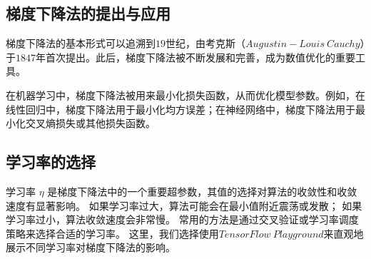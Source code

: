 \documentclass[printMode=true, declarePage=false]{ecnuthesis}
\begin{document}
    \subsection{梯度下降法的提出与应用}
    梯度下降法的基本形式可以追溯到$19$世纪，由考克斯（$Augustin-Louis\ Cauchy$）于$1847$年首次提出。此后，梯度下降法被不断发展和完善，成为数值优化的重要工具。

    在机器学习中，梯度下降法被用来最小化损失函数，从而优化模型参数。例如，在线性回归中，梯度下降法用于最小化均方误差；在神经网络中，梯度下降法用于最小化交叉熵损失或其他损失函数。

    \subsection{学习率的选择}
    学习率 \( \eta \) 是梯度下降法中的一个重要超参数，其值的选择对算法的收敛性和收敛速度有显著影响。
    如果学习率过大，算法可能会在最小值附近震荡或发散；
    如果学习率过小，算法收敛速度会非常慢。
    常用的方法是通过交叉验证或学习率调度策略来选择合适的学习率。
    这里，我们选择使用\href{https://playground.tensorflow.org/}{$TensorFlow\ Playground$}来直观地展示不同学习率对梯度下降法的影响。
    
\end{document}
